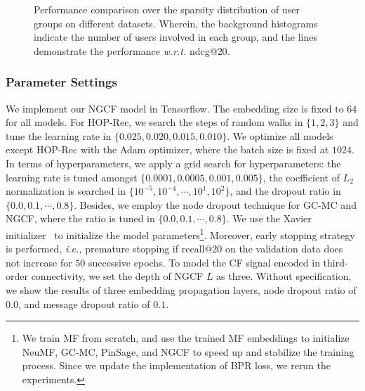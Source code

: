\documentclass[sigconf]{acmart}
\newcommand{\ie}{\emph{i.e., }}
\newcommand{\wrt}{\emph{w.r.t. }}
\theoremstyle{definition}
\begin{document}
\begin{figure*}[t]
\centering
{}
\vspace{-15pt}
\caption{Performance comparison over the sparsity distribution of user groups on different datasets.
Wherein, the background histograms indicate the number of users involved in each group, and the lines demonstrate the performance \wrt ndcg@$20$.}
\label{fig:sparsity}\vspace{-10pt}
\end{figure*}

\subsubsection{\textbf{Parameter Settings}}
We implement our NGCF model in Tensorflow.
The embedding size is fixed to $64$ for all models.
For HOP-Rec, we search the steps of random walks in $\{1,2,3\}$ and tune the learning rate in $\{0.025,0.020,0.015,0.010\}$.
We optimize all models except HOP-Rec with the Adam optimizer, where the batch size is fixed at $1024$.
In terms of hyperparameters, we apply a grid search for hyperparameters: the learning rate is tuned amongst $\{0.0001,0.0005,0.001,0.005\}$, the coefficient of $L_{2}$ normalization is searched in $\{10^{-5},10^{-4},\cdots,10^{1},10^{2}\}$, and the dropout ratio in $\{0.0,0.1,\cdots,0.8\}$.
Besides, we employ the node dropout technique for GC-MC and NGCF, where the ratio is tuned in $\{0.0,0.1,\cdots,0.8\}$.
We use the Xavier initializer~\cite{Xarvier} to initialize the model parameters\footnote{We train MF from scratch, and use the trained MF embeddings to initialize NeuMF, GC-MC, PinSage, and NGCF to speed up and stabilize the training process. Since we update the implementation of BPR loss, we rerun the experiments.}.
Moreover, early stopping strategy is performed, \ie premature stopping if recall@$20$ on the validation data does not increase for $50$ successive epochs.
To model the CF signal encoded in third-order connectivity, we set the depth of NGCF $L$ as three.
Without specification, we show the results of three embedding propagation layers, node dropout ratio of $0.0$, and message dropout ratio of $0.1$.
\end{document}
